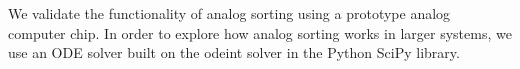 We validate the functionality of analog sorting using a prototype analog computer chip.
In order to explore how analog sorting works in larger systems, we use an ODE solver built on the odeint solver in the Python SciPy library.

